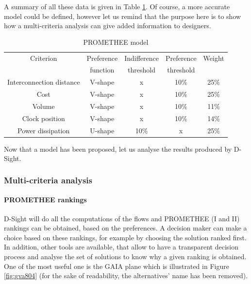 A summary of all these data is given in Table \ref{tab:preffunc}. Of course, a more accurate model could be defined, however let us remind that the purpose here is to show how a multi-criteria analysis can give added information to designers.

\begin{table}[h!]
\caption{PROMETHEE model}
\begin{center}
\begin{tabular}{|c|c|c|c|c|}
\hline
Criterion & Preference & Indifference  & Preference & Weight \\
 & function & threshold & threshold & \\
\hline
Interconnection distance & V-shape & x & 10\% & 25\% \\
Cost & V-shape & x & 10\% & 25\% \\
Volume & V-shape & x & 10\% & 11\% \\
Clock position & V-shape & x & 10\% & 14\% \\
Power dissipation & U-shape & 10\% & x & 25\% \\
\hline
\end{tabular}
\end{center}
\label{tab:preffunc}
\end{table}

Now that a model has been proposed, let us analyse the results produced by D-Sight.

\subsubsection{Multi-criteria analysis}

\paragraph{PROMETHEE rankings}
D-Sight will do all the computations of the flows and PROMETHEE (I and II) rankings can be obtained, based on the preferences. A decision maker can make a choice based on these rankings, for example by choosing the solution ranked first. In addition, other tools are available, that allow to have a transparent decision process and analyse the set of solutions to know why a given ranking is obtained. One of the most useful one is the GAIA plane which is illustrated in Figure \ref{fig:gva804} (for the sake of readability, the alternatives' name has been removed).

